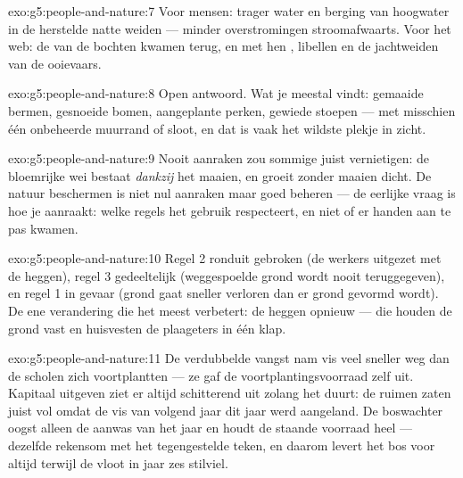 \begin{solution}{exo:g5:people-and-nature:7}
Voor mensen: trager water en berging van hoogwater in de herstelde natte
weiden --- minder overstromingen stroomafwaarts. Voor het web: de
 van de bochten kwamen terug, en met hen , libellen en
de jachtweiden van de ooievaars.
\end{solution}

\begin{solution}{exo:g5:people-and-nature:8}
Open antwoord. Wat je meestal vindt: gemaaide bermen, gesnoeide bomen,
aangeplante perken, gewiede stoepen --- met misschien één onbeheerde
muurrand of sloot, en dat is vaak het wildste plekje in zicht.
\end{solution}

\begin{solution}{exo:g5:people-and-nature:9}
Nooit aanraken zou sommige  juist vernietigen: de bloemrijke
wei bestaat \emph{dankzij} het maaien, en groeit zonder maaien dicht. De
natuur beschermen is niet nul aanraken maar goed beheren --- de eerlijke
vraag is hoe je aanraakt: welke regels het gebruik respecteert, en niet
of er handen aan te pas kwamen.
\end{solution}

\begin{solution}{exo:g5:people-and-nature:10}
Regel 2 ronduit gebroken (de werkers uitgezet met de heggen), regel 3
gedeeltelijk (weggespoelde grond wordt nooit teruggegeven), en regel 1 in
gevaar (grond gaat sneller verloren dan er grond gevormd wordt). De ene
verandering die het meest verbetert: de heggen opnieuw  --- die
houden de grond vast en huisvesten de plaageters in één klap.
\end{solution}

\begin{solution}{exo:g5:people-and-nature:11}
De verdubbelde vangst nam vis veel sneller weg dan de scholen zich
voortplantten --- ze gaf de voortplantingsvoorraad zelf uit. Kapitaal
uitgeven ziet er altijd schitterend uit zolang het duurt: de ruimen
zaten juist vol omdat de vis van volgend jaar dit jaar werd aangeland.
De boswachter oogst alleen de aanwas van het jaar en houdt de staande
voorraad heel --- dezelfde rekensom met het tegengestelde teken, en
daarom levert het bos voor altijd terwijl de vloot in jaar zes stilviel.
\end{solution}
